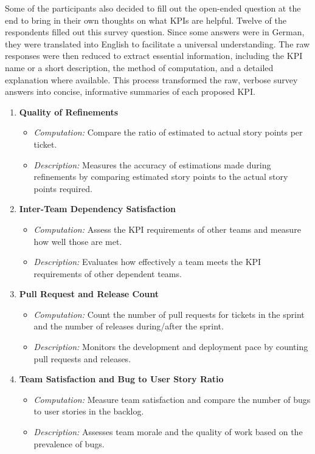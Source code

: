 Some of the participants also decided to fill out the open-ended question at the end to bring in their own thoughts on what KPIs are helpful. Twelve of the respondents filled out this survey question. Since some answers were in German, they were translated into English to facilitate a universal understanding. The raw responses were then reduced to extract essential information, including the KPI name or a short description, the method of computation, and a detailed explanation where available. This process transformed the raw, verbose survey answers into concise, informative summaries of each proposed KPI. 

\begin{enumerate}
    \item \textbf{Quality of Refinements}
    \begin{itemize}
        \item \textit{Computation:} Compare the ratio of estimated to actual story points per ticket.
        \item \textit{Description:} Measures the accuracy of estimations made during refinements by comparing estimated story points to the actual story points required.
    \end{itemize}
    
    \item \textbf{Inter-Team Dependency Satisfaction}
    \begin{itemize}
        \item \textit{Computation:} Assess the KPI requirements of other teams and measure how well those are met.
        \item \textit{Description:} Evaluates how effectively a team meets the KPI requirements of other dependent teams.
    \end{itemize}

    \item \textbf{Pull Request and Release Count}
    \begin{itemize}
        \item \textit{Computation:} Count the number of pull requests for tickets in the sprint and the number of releases during/after the sprint.
        \item \textit{Description:} Monitors the development and deployment pace by counting pull requests and releases.
    \end{itemize}
    
    \item \textbf{Team Satisfaction and Bug to User Story Ratio}
    \begin{itemize}
        \item \textit{Computation:} Measure team satisfaction and compare the number of bugs to user stories in the backlog.
        \item \textit{Description:} Assesses team morale and the quality of work based on the prevalence of bugs.
    \end{itemize}


\end{enumerate}
